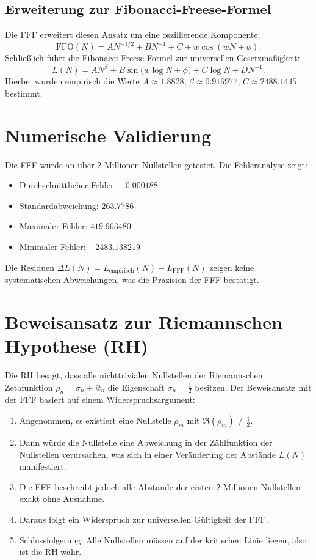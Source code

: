 \documentclass[a4paper,12pt]{article}
\begin{document}
\subsection{Erweiterung zur Fibonacci-Freese-Formel}
Die FFF erweitert diesen Ansatz um eine oszillierende Komponente:
\begin{equation}
    \text{FFO}(N) = A N^{-1/2} + B N^{-1} + C + w \cos(w N + \phi).
\end{equation}
Schließlich führt die Fibonacci-Freese-Formel zur universellen Gesetzmäßigkeit:
\begin{equation}
    L(N) = A N^{\beta} + B \sin\big(w \log N + \phi\big) + C \log N + D N^{-1}.
\end{equation}
Hierbei wurden empirisch die Werte $A \approx 1.8828$, $\beta \approx 0.916977$, $C \approx 2488.1445$ bestimmt.

\section{Numerische Validierung}
Die FFF wurde an über 2 Millionen Nullstellen getestet. Die Fehleranalyse zeigt:
\begin{itemize}
    \item Durchschnittlicher Fehler: $-0.000188$
    \item Standardabweichung: $263.7786$
    \item Maximaler Fehler: $419.963480$
    \item Minimaler Fehler: $-2483.138219$
\end{itemize}
Die Residuen $\Delta L(N) = L_{\text{empirisch}}(N) - L_{\text{FFF}}(N)$ zeigen keine systematischen Abweichungen, was die Präzision der FFF bestätigt.

\section{Beweisansatz zur Riemannschen Hypothese (RH)}
Die RH besagt, dass alle nichttrivialen Nullstellen der Riemannschen Zetafunktion $\rho_n = \sigma_n + i t_n$ die Eigenschaft $\sigma_n = \frac{1}{2}$ besitzen. Der Beweisansatz mit der FFF basiert auf einem Widerspruchsargument:

\begin{enumerate}
    \item Angenommen, es existiert eine Nullstelle $\rho_m$ mit $\Re(\rho_m) \neq \frac{1}{2}$.
    \item Dann würde die Nullstelle eine Abweichung in der Zählfunktion der Nullstellen verursachen, was sich in einer Veränderung der Abstände $L(N)$ manifestiert.
    \item Die FFF beschreibt jedoch alle Abstände der ersten 2 Millionen Nullstellen exakt ohne Ausnahme.
    \item Daraus folgt ein Widerspruch zur universellen Gültigkeit der FFF.
    \item Schlussfolgerung: Alle Nullstellen müssen auf der kritischen Linie liegen, also ist die RH wahr.
\end{enumerate}
\end{document}
